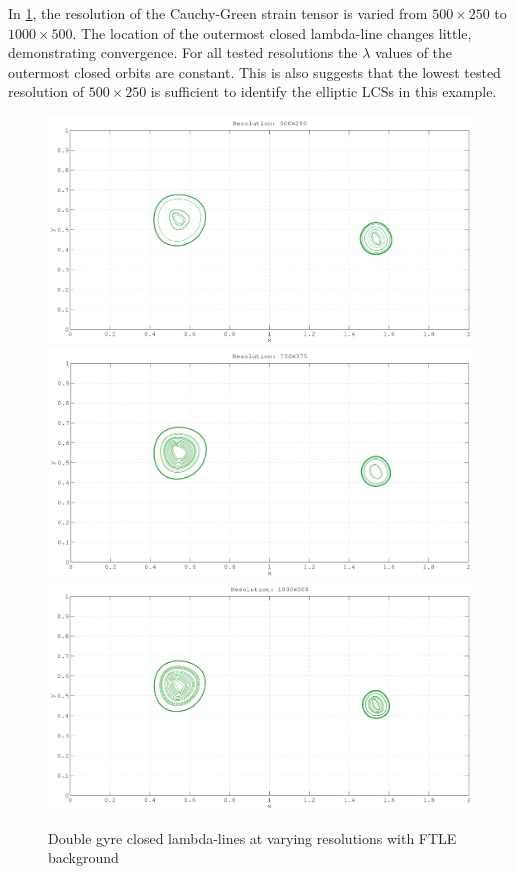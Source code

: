 \documentclass{article}
\begin{document}


In \cref{fig:double_gyre_lambda_lcs_convergence}, the resolution of the  Cauchy-Green strain tensor is varied from $500 \times 250$ to $1000 \times 500$. The location of the outermost closed lambda-line changes little, demonstrating convergence. For all tested resolutions the $\lambda$ values of the outermost closed orbits are constant. This is also suggests that the lowest tested resolution of $500 \times 250$ is sufficient to identify the elliptic LCSs in this example.

\begin{figure}[hbt]
\centering
\includegraphics[width=.8\textwidth]{graphics/double_gyre/lambda_lcs_convergence_500}
\includegraphics[width=.8\textwidth]{graphics/double_gyre/lambda_lcs_convergence_750}
\includegraphics[width=.8\textwidth]{graphics/double_gyre/lambda_lcs_convergence_1000}
\caption{Double gyre closed lambda-lines at varying resolutions with FTLE background}
\label{fig:double_gyre_lambda_lcs_convergence}
\end{figure}
\end{document}
